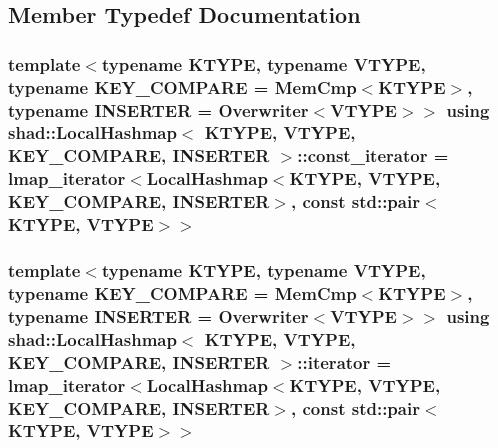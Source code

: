 \subsection{Member Typedef Documentation}
\hypertarget{classshad_1_1LocalHashmap_ad5e054bdbc20f161cd8df8e00c525401}{
\subsubsection[{const\-\_\-iterator}]{\setlength{\rightskip}{0pt plus 5cm}template$<$typename K\-T\-Y\-P\-E, typename V\-T\-Y\-P\-E, typename K\-E\-Y\-\_\-\-C\-O\-M\-P\-A\-R\-E = Mem\-Cmp$<$\-K\-T\-Y\-P\-E$>$, typename I\-N\-S\-E\-R\-T\-E\-R = Overwriter$<$\-V\-T\-Y\-P\-E$>$$>$ using {\bf shad\-::\-Local\-Hashmap}$<$ K\-T\-Y\-P\-E, V\-T\-Y\-P\-E, K\-E\-Y\-\_\-\-C\-O\-M\-P\-A\-R\-E, I\-N\-S\-E\-R\-T\-E\-R $>$\-::{\bf const\-\_\-iterator} =  {\bf lmap\-\_\-iterator}$<${\bf Local\-Hashmap}$<$K\-T\-Y\-P\-E, V\-T\-Y\-P\-E, K\-E\-Y\-\_\-\-C\-O\-M\-P\-A\-R\-E, I\-N\-S\-E\-R\-T\-E\-R$>$, const std\-::pair$<$K\-T\-Y\-P\-E, V\-T\-Y\-P\-E$>$$>$}}\label{classshad_1_1LocalHashmap_ad5e054bdbc20f161cd8df8e00c525401}
\hypertarget{classshad_1_1LocalHashmap_aafdf55e8d9fa4799bcef4881baf25a71}{
\subsubsection[{iterator}]{\setlength{\rightskip}{0pt plus 5cm}template$<$typename K\-T\-Y\-P\-E, typename V\-T\-Y\-P\-E, typename K\-E\-Y\-\_\-\-C\-O\-M\-P\-A\-R\-E = Mem\-Cmp$<$\-K\-T\-Y\-P\-E$>$, typename I\-N\-S\-E\-R\-T\-E\-R = Overwriter$<$\-V\-T\-Y\-P\-E$>$$>$ using {\bf shad\-::\-Local\-Hashmap}$<$ K\-T\-Y\-P\-E, V\-T\-Y\-P\-E, K\-E\-Y\-\_\-\-C\-O\-M\-P\-A\-R\-E, I\-N\-S\-E\-R\-T\-E\-R $>$\-::{\bf iterator} =  {\bf lmap\-\_\-iterator}$<${\bf Local\-Hashmap}$<$K\-T\-Y\-P\-E, V\-T\-Y\-P\-E, K\-E\-Y\-\_\-\-C\-O\-M\-P\-A\-R\-E, I\-N\-S\-E\-R\-T\-E\-R$>$, const std\-::pair$<$K\-T\-Y\-P\-E, V\-T\-Y\-P\-E$>$$>$}}\label{classshad_1_1LocalHashmap_aafdf55e8d9fa4799bcef4881baf25a71}
